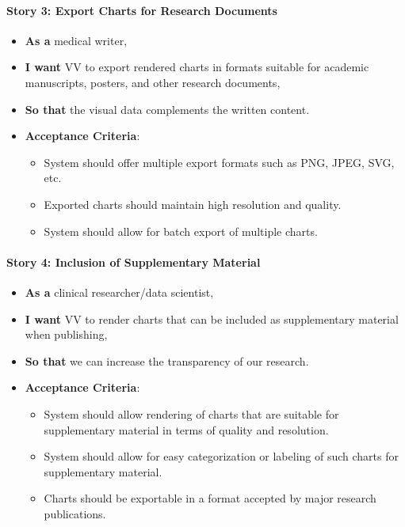 \paragraph{Story 3: Export Charts for Research
Documents}\label{story-3-export-charts-for-research-documents}

\begin{itemize}
\item
  \textbf{As a} medical writer,
\item
  \textbf{I want} VV to export rendered charts in formats suitable for
  academic manuscripts, posters, and other research documents,
\item
  \textbf{So that} the visual data complements the written content.
\item
  \textbf{Acceptance Criteria}:

  \begin{itemize}
  \item
    System should offer multiple export formats such as PNG, JPEG, SVG,
    etc.
  \item
    Exported charts should maintain high resolution and quality.
  \item
    System should allow for batch export of multiple charts.
  \end{itemize}
\end{itemize}

\paragraph{Story 4: Inclusion of Supplementary
Material}\label{story-4-inclusion-of-supplementary-material}

\begin{itemize}
\item
  \textbf{As a} clinical researcher/data scientist,
\item
  \textbf{I want} VV to render charts that can be included as
  supplementary material when publishing,
\item
  \textbf{So that} we can increase the transparency of our research.
\item
  \textbf{Acceptance Criteria}:

  \begin{itemize}
  \item
    System should allow rendering of charts that are suitable for
    supplementary material in terms of quality and resolution.
  \item
    System should allow for easy categorization or labeling of such
    charts for supplementary material.
  \item
    Charts should be exportable in a format accepted by major research
    publications.
  \end{itemize}
\end{itemize}

